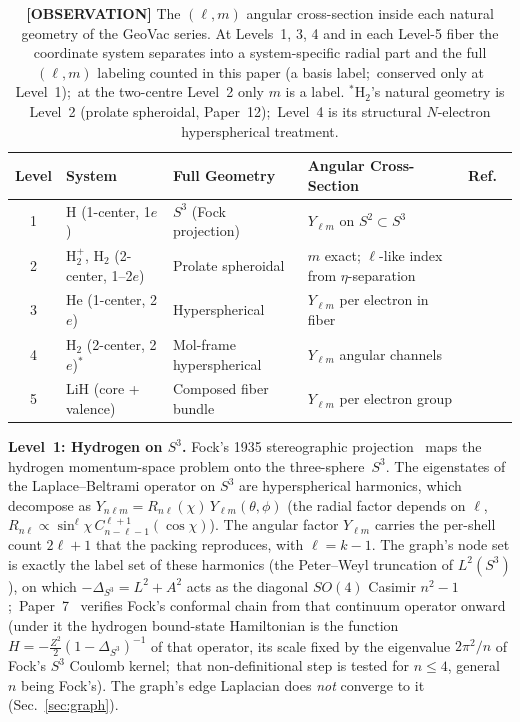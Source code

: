 \documentclass[aps,prl,reprint,amsmath,amssymb]{revtex4-2}
\begin{document}
\begin{table}[h]
\centering
\begin{tabular}{cllll}
\toprule
Level & System & Full Geometry & Angular Cross-Section & Ref.\ \\
\midrule
1 & H (1-center, 1$e$)
  & $S^3$ (Fock projection)
  & $Y_{\ell m}$ on $S^2 \subset S^3$
  & \cite{paper7} \\
2 & H$_2^+$, H$_2$ (2-center, 1--2$e$)
  & Prolate spheroidal
  & $m$ exact; $\ell$-like index from $\eta$-separation
  & \cite{paper11,paper12} \\
3 & He (1-center, 2$e$)
  & Hyperspherical
  & $Y_{\ell m}$ per electron in fiber
  & \cite{paper13} \\
4 & H$_2$ (2-center, 2$e$)$^{\ast}$
  & Mol-frame hyperspherical
  & $Y_{\ell m}$ angular channels
  & \cite{paper15} \\
5 & LiH (core + valence)
  & Composed fiber bundle
  & $Y_{\ell m}$ per electron group
  & \cite{paper17} \\
\bottomrule
\end{tabular}
\caption{\textbf{[OBSERVATION]} The $(\ell, m)$ angular cross-section
  inside each natural geometry of the GeoVac series.  At Levels~1, 3, 4
  and in each Level-5 fiber the coordinate system separates into a
  system-specific radial part and the full $(\ell, m)$ labeling
  counted in this paper (a basis label;\ conserved only at
  Level~1);\ at the two-centre Level~2 only $m$ is a label.
  $^{\ast}$H$_2$'s natural geometry is Level~2 (prolate spheroidal,
  Paper~12);\ Level~4 is its structural $N$-electron hyperspherical
  treatment.}
\label{tab:cross-section}
\end{table}

\textbf{Level~1: Hydrogen on $S^3$.}
Fock's 1935 stereographic projection~\cite{fock1935} maps the hydrogen
momentum-space problem onto the three-sphere~$S^3$.  The eigenstates
of the Laplace--Beltrami operator on $S^3$ are hyperspherical
harmonics, which decompose as $Y_{n\ell m} = R_{n\ell}(\chi) \,
Y_{\ell m}(\theta, \phi)$ (the radial factor depends on $\ell$,
$R_{n\ell} \propto \sin^\ell\chi\, C^{\ell+1}_{n-\ell-1}(\cos\chi)$).  The angular factor $Y_{\ell m}$ carries
the per-shell count $2\ell + 1$ that the packing reproduces, with $\ell = k - 1$.
The graph's node set is exactly the label set of these harmonics
(the Peter--Weyl truncation of $L^2(S^3)$), on which
$-\Delta_{S^3} = L^2 + A^2$ acts as the diagonal $SO(4)$ Casimir
$n^2 - 1$;\ Paper~7~\cite{paper7}
verifies Fock's conformal chain from that continuum operator onward
(under it the hydrogen bound-state Hamiltonian is the function
$H = -\tfrac{Z^2}{2}(1-\Delta_{S^3})^{-1}$ of that operator, its scale fixed by the
eigenvalue $2\pi^2/n$ of Fock's $S^3$ Coulomb kernel;\ that
non-definitional step is tested for $n \le 4$, general $n$ being
Fock's).
The graph's edge Laplacian does \emph{not} converge to it
(Sec.~\ref{sec:graph}).
\end{document}
